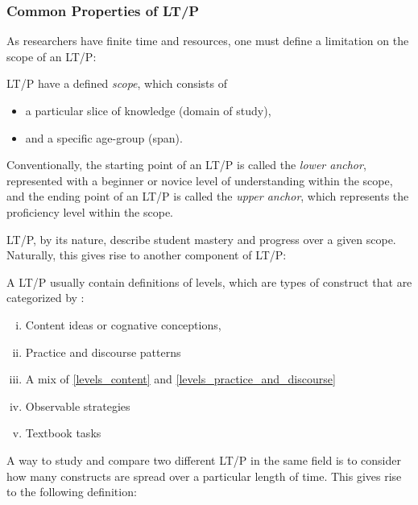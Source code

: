 \documentclass{TC}
\begin{document}
\subsubsection{Common Properties of LT/P}

As researchers have finite time and resources, one must define a limitation on the scope of an LT/P:

\begin{mdframed}
\begin{definition}[Scope of LT/P]
LT/P have a defined \emph{scope}, which consists of
\begin{itemize}
\item a particular slice of knowledge (domain of study), \item and a specific age-group (span).
\end{itemize}
Conventionally, the starting point of an LT/P is called the \emph{lower anchor}, represented with a beginner or novice level of understanding within the scope, and the ending point of an LT/P is called the \emph{upper anchor}, which represents the proficiency level within the scope.
\end{definition}
\end{mdframed}
LT/P, by its nature, describe student mastery and progress over a given scope. Naturally, this gives rise to another component of LT/P:
\begin{mdframed}
\begin{definition}[Levels of LT/P]
A LT/P usually contain definitions of levels, which are types of construct that are categorized by \parencite{duncan_learning_2018} \parencite{lobato_taxonomy_2017}:
\begin{enumerate}[(i)]
\item Content ideas or cognative conceptions, \label{levels_content}
\item Practice and discourse patterns \label{levels_practice_and_discourse}
\item A mix of \ref{levels_content} and \ref{levels_practice_and_discourse} 
\item Observable strategies
\item Textbook tasks
\end{enumerate}
\end{definition}
\end{mdframed}

A way to study and compare two different LT/P in the same field is to consider how many constructs are spread over a particular length of time. This gives rise to the following definition:
\end{document}
